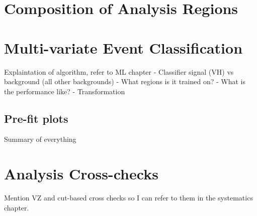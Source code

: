 \section{Composition of Analysis Regions}



\section{Multi-variate Event Classification}%
\label{sec:mva}
Explaintation of algorithm, refer to ML chapter
- Classifier signal (VH) vs background (all other backgrounds)
- What regions is it trained on?
- What is the performance like?
- Transformation





\subsection{Pre-fit plots}
Summary of everything






\section{Analysis Cross-checks}
Mention VZ and cut-based cross checks so I can refer to them in the systematics
chapter.





